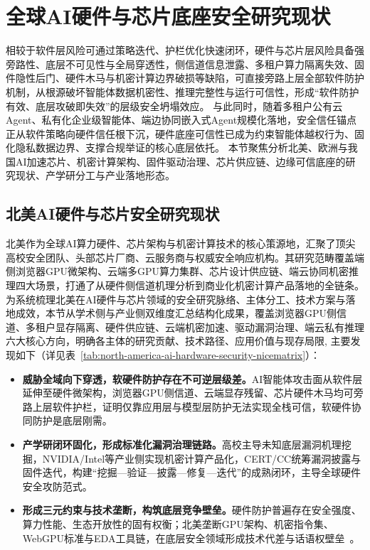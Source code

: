\section{全球AI硬件与芯片底座安全研究现状}
相较于软件层风险可通过策略迭代、护栏优化快速闭环，硬件与芯片层风险具备强旁路性、底层不可见性与全局穿透性，侧信道信息泄露、多租户算力隔离失效、固件隐性后门、硬件木马与机密计算边界破损等缺陷，可直接旁路上层全部软件防护机制，从根源破坏智能体数据机密性、推理完整性与运行可信性，形成“软件防护有效、底层攻破即失效”的层级安全坍塌效应。
与此同时，随着多租户公有云Agent、私有化企业级智能体、端边协同嵌入式Agent规模化落地，安全信任锚点正从软件策略向硬件信任根下沉，硬件底座可信性已成为约束智能体越权行为、固化隐私数据边界、支撑合规举证的核心底层依托。
%
%
本节聚焦分析北美、欧洲与我国AI加速芯片、机密计算架构、固件驱动治理、芯片供应链、边缘可信底座的研究现状、产学研分工与产业落地形态。

\subsection{北美AI硬件与芯片安全研究现状}
北美作为全球AI算力硬件、芯片架构与机密计算技术的核心策源地，汇聚了顶尖高校安全团队、头部芯片厂商、云服务商与权威安全响应机构。其研究范畴覆盖端侧浏览器GPU微架构、云端多GPU算力集群、芯片设计供应链、端云协同机密推理四大场景，打通了从硬件侧信道机理分析到商业化机密计算产品落地的全链条。为系统梳理北美在AI硬件与芯片领域的安全研究脉络、主体分工、技术方案与落地成效，本节从学术侧与产业侧双维度汇总结构化成果，覆盖浏览器GPU侧信道、多租户显存隔离、硬件供应链、云端机密加速、驱动漏洞治理、端云私有推理六大核心方向，明确各主体的研究贡献、技术路径、应用价值与现存局限, 主要发现如下（详见表~\ref{tab:north-america-ai-hardware-security-nicematrix}）：

\begin{itemize}[tabitem]
\item \textbf{威胁全域向下穿透，软硬件防护存在不可逆层级差。}AI智能体攻击面从软件层延伸至硬件微架构，浏览器GPU侧信道、云端显存残留、芯片硬件木马均可旁路上层软件护栏，证明仅靠应用层与模型层防护无法实现全栈可信，软硬件协同防护是底层刚需。
\item \textbf{产学研闭环固化，形成标准化漏洞治理链路。}高校主导未知底层漏洞机理挖掘，NVIDIA/Intel等产业侧实现机密计算产品化，CERT/CC统筹漏洞披露与固件迭代，构建“挖掘—验证—披露—修复—迭代”的成熟闭环，主导全球硬件安全攻防范式。
\item \textbf{形成三元约束与技术垄断，构筑底层竞争壁垒。}硬件防护普遍存在安全强度、算力性能、生态开放性的固有权衡；北美垄断GPU架构、机密指令集、WebGPU标准与EDA工具链，在底层安全领域形成技术代差与话语权壁垒~\cite{darpaAISS}。

\end{itemize}

